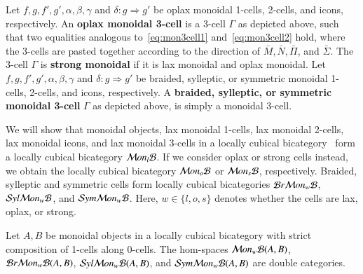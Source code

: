 \begin{defn}
  Let $f,g,f',g', \alpha, \beta, \gamma$ and $\delta: g \Rightarrow g'$ be oplax monoidal 1-cells, 2-cells, and icons, respectively. An \textbf{oplax monoidal 3-cell} is a 3-cell  $\Gamma$ as depicted above, such that two equalities analogous to~\eqref{eq:mon3cell1} and~\eqref{eq:mon3cell2} hold, where the 3-cells are pasted together according to the direction of $\bar{M}, \bar{N}, \bar{\Pi}$, and $\bar{\Sigma}$. The 3-cell $\Gamma$ is {\bf strong monoidal} if it is lax monoidal and oplax monoidal.
Let $f,g,f',g', \alpha, \beta, \gamma$ and $\delta: g \Rightarrow g'$ be braided, sylleptic, or symmetric monoidal 1-cells, 2-cells, and icons, respectively. A \textbf{braided, sylleptic, or symmetric monoidal 3-cell} $\Gamma$ as depicted above, is simply a monoidal 3-cell. 
\end{defn}

We will show that monoidal objects, lax monoidal 1-cells, lax monoidal 2-cells, lax monoidal icons, and lax monoidal 3-cells in a locally cubical bicategory \fB\ form a locally cubical bicategory $\mathcal{M} on_l\mathcal{B}$. If we consider oplax or strong cells instead, we obtain the locally cubical bicategory $\mathcal{M} on_o\mathcal{B}$ or $\mathcal{M} on_s\mathcal{B}$, respectively. Braided, sylleptic and symmetric cells form  locally cubical bicategories $\mathcal{B} r \mathcal{M} on_w\mathcal{B}$, $\mathcal{S} yl \mathcal{M} on_w\mathcal{B}$, and $\mathcal{S} ym \mathcal{M} on_w\mathcal{B}$. Here, $w \in \{l,o,s\}$ denotes whether the cells are lax, oplax, or strong.

\begin{prop}\label{prop:dc}
Let $A,B$ be monoidal objects in a locally cubical bicategory with strict composition of 1-cells along 0-cells. The hom-spaces $\mathcal{M} on_w\mathcal{B} (A,B)$, $\mathcal{B} r \mathcal{M} on_w\mathcal{B}(A,B)$, $\mathcal{S} yl \mathcal{M} on_w\mathcal{B}(A,B)$, and $\mathcal{S} ym \mathcal{M} on_w\mathcal{B}(A,B)$ are double categories.
\end{prop}

